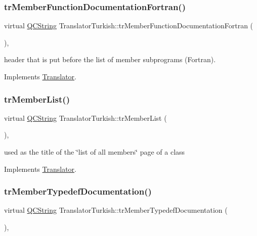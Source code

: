 \subsubsection{\texorpdfstring{trMemberFunctionDocumentationFortran()}{trMemberFunctionDocumentationFortran()}}
{\footnotesize\ttfamily virtual \mbox{\hyperlink{class_q_c_string}{Q\+C\+String}} Translator\+Turkish\+::tr\+Member\+Function\+Documentation\+Fortran (\begin{DoxyParamCaption}{ }\end{DoxyParamCaption})\hspace{0.3cm}{\ttfamily [inline]}, {\ttfamily [virtual]}}

header that is put before the list of member subprograms (Fortran). 

Implements \mbox{\hyperlink{class_translator}{Translator}}.

\mbox{\label{class_translator_turkish_a357b76f03168ddda3d491c8bd5f57925}} 
\subsubsection{\texorpdfstring{trMemberList()}{trMemberList()}}
{\footnotesize\ttfamily virtual \mbox{\hyperlink{class_q_c_string}{Q\+C\+String}} Translator\+Turkish\+::tr\+Member\+List (\begin{DoxyParamCaption}{ }\end{DoxyParamCaption})\hspace{0.3cm}{\ttfamily [inline]}, {\ttfamily [virtual]}}

used as the title of the \char`\"{}list of all members\char`\"{} page of a class 

Implements \mbox{\hyperlink{class_translator}{Translator}}.

\mbox{\label{class_translator_turkish_a63ced96fd5c8cb647d40732ac7a9b4f7}} 
\subsubsection{\texorpdfstring{trMemberTypedefDocumentation()}{trMemberTypedefDocumentation()}}
{\footnotesize\ttfamily virtual \mbox{\hyperlink{class_q_c_string}{Q\+C\+String}} Translator\+Turkish\+::tr\+Member\+Typedef\+Documentation (\begin{DoxyParamCaption}{ }\end{DoxyParamCaption})\hspace{0.3cm}{\ttfamily [inline]}, {\ttfamily [virtual]}}

